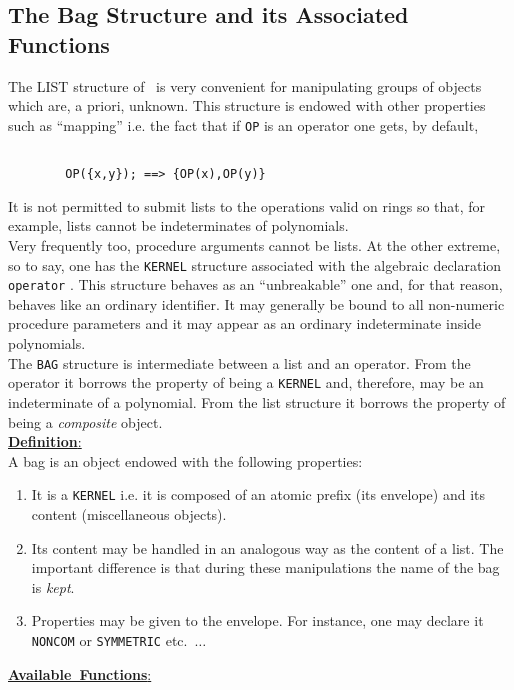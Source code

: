 \subsection{ The Bag Structure and its Associated Functions}
The LIST structure of \REDUCE\ is very convenient for manipulating
groups of objects which are, a priori, unknown. This structure is
endowed with other properties such as ``mapping'' i.e. the fact that
if \verb+OP+ is an operator one gets, by default,
\begin{verbatim}

        OP({x,y}); ==> {OP(x),OP(y)}

\end{verbatim}
It is not permitted to submit lists to the operations valid on rings
so that, for example, lists cannot be indeterminates of polynomials.\\
Very frequently too, procedure arguments cannot be lists.
At the other extreme, so to say, one has the \verb+KERNEL+
structure associated
with the algebraic declaration \verb+operator+ .  This structure behaves as
an ``unbreakable'' one and, for that reason, behaves
like an ordinary identifier.
It may generally be bound to all non-numeric procedure parameters
and it may appear
as an ordinary indeterminate inside polynomials. \\
The \verb+BAG+ structure is intermediate between a list and an operator.
From the operator it borrows the property of being a \verb+KERNEL+ and,
therefore, may be an indeterminate of a polynomial. From the list structure
it borrows the property of being a {\em composite} object.\\[5pt]
\mbox{\underline{{\bf Definition}:\hfill}}\\[4pt]
A bag is an object endowed with the following properties:
\begin{enumerate}
\item It is a \verb+KERNEL+ i.e. it is  composed of an atomic prefix (its
envelope) and
its content (miscellaneous objects).
\item Its content may be handled in an analogous way as the content of a
list. The important difference is that during these manipulations 
the name of the bag is {\em kept}.
\item Properties may be given to the envelope. For instance, one may
declare it \verb+NONCOM+ or \verb+SYMMETRIC+ etc.\ $\ldots$
\end{enumerate}
\vspace{5pt}
\mbox{\underline{{\bf Available Functions}:\hfill}}
